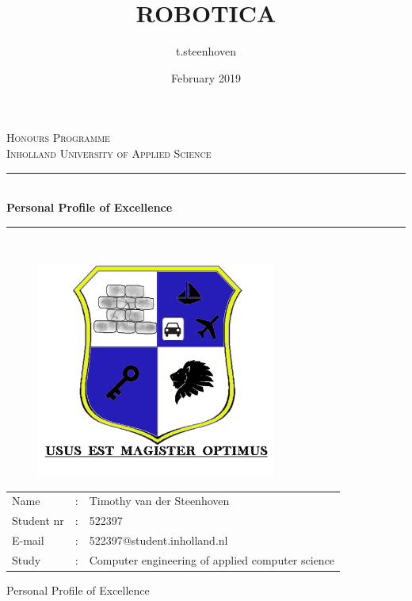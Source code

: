 \documentclass{article}
\title{ROBOTICA}
\author{t.steenhoven }
\date{February 2019}
\begin{document}
\begin{titlepage}
\newcommand{\HRule}{\rule{\linewidth}{0.5mm}}
\center

\textsc{\LARGE Honours Programme }\\[1.5cm]

\textsc{\large Inholland University of Applied Science}\\[.5cm]

\HRule \\[0.4cm]
{ \huge \bfseries Personal Profile of Excellence}\\[0.4cm] %
\HRule \\[1.5cm]
\Large

\setlength{\parindent}{0em}

\begin{figure}[!h]
	\centering
	\includegraphics[width=0.7\textwidth]{shield}
\end{figure}

\begin{table}[!h]
	\centering
	\begin{tabular}{l c l}
		Name &:& Timothy van der Steenhoven \\
		Student nr &:& 522397 \\
		E-mail &:& 522397@student.inholland.nl\\
		Study &:& Computer engineering of applied computer science\\
	\end{tabular}
\end{table}
\newpage
\pagestyle{empty}
\begin{center}
 
    {\LARGE Personal Profile of Excellence}
    \\[4cm]
    

\end{center}
\end{titlepage}
\end{document}

